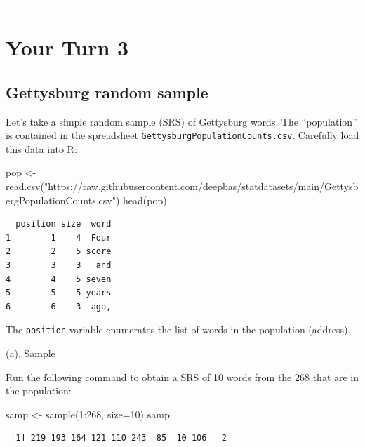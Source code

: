 \documentclass[
]{book}
\newenvironment{Shaded}{\begin{snugshade}}{\end{snugshade}}
\newcommand{\AttributeTok}[1]{\textcolor[rgb]{0.77,0.63,0.00}{#1}}
\newcommand{\DecValTok}[1]{\textcolor[rgb]{0.00,0.00,0.81}{#1}}
\newcommand{\FunctionTok}[1]{\textcolor[rgb]{0.00,0.00,0.00}{#1}}
\newcommand{\NormalTok}[1]{#1}
\newcommand{\OtherTok}[1]{\textcolor[rgb]{0.56,0.35,0.01}{#1}}
\newcommand{\SpecialCharTok}[1]{\textcolor[rgb]{0.00,0.00,0.00}{#1}}
\newcommand{\StringTok}[1]{\textcolor[rgb]{0.31,0.60,0.02}{#1}}
\begin{document}
\begin{center}\rule{0.5\linewidth}{0.5pt}\end{center}

\hypertarget{your-turn-3}{%
\section{Your Turn 3}\label{your-turn-3}}

\hypertarget{gettysburg-random-sample}{%
\subsection{Gettysburg random sample}\label{gettysburg-random-sample}}

Let's take a simple random sample (SRS) of Gettysburg words. The ``population'' is contained in the
spreadsheet \texttt{GettysburgPopulationCounts.csv}. Carefully load this data into R:

\begin{Shaded}
\begin{Highlighting}[]
\NormalTok{pop }\OtherTok{\textless{}{-}} \FunctionTok{read.csv}\NormalTok{(}\StringTok{"https://raw.githubusercontent.com/deepbas/statdatasets/main/GettysbergPopulationCounts.csv"}\NormalTok{)}
\FunctionTok{head}\NormalTok{(pop)}
\end{Highlighting}
\end{Shaded}

\begin{verbatim}
  position size  word
1        1    4  Four
2        2    5 score
3        3    3   and
4        4    5 seven
5        5    5 years
6        6    3  ago,
\end{verbatim}

The \texttt{position} variable enumerates the list of words in the population (address).

(a). Sample

Run the following command to obtain a SRS of 10 words from the 268 that are in the population:

\begin{Shaded}
\begin{Highlighting}[]
\NormalTok{samp }\OtherTok{\textless{}{-}} \FunctionTok{sample}\NormalTok{(}\DecValTok{1}\SpecialCharTok{:}\DecValTok{268}\NormalTok{, }\AttributeTok{size=}\DecValTok{10}\NormalTok{)}
\NormalTok{samp}
\end{Highlighting}
\end{Shaded}

\begin{verbatim}
 [1] 219 193 164 121 110 243  85  10 106   2
\end{verbatim}
\end{document}
